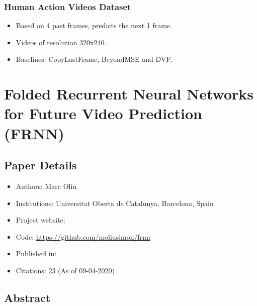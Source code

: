 \documentclass{article}
\begin{document}
    \subsubsection{Human Action Videos Dataset}\label{subsubsec:DYAN_A_Dynamical_Atoms_Based_Network_For_Video_Prediction:ucf-dataset}
    \begin{itemize}
        \item Based on 4 past frames, predicts the next 1 frame.
        \item Videos of resolution 320x240.
        \item Baselines: CopyLastFrame, BeyondMSE and DVF\@.
    \end{itemize}
    \newpage


    \section{Folded Recurrent Neural Networks for Future Video Prediction (FRNN)}\label{sec:Folded_Recurrent_Neural_Networks_for_Future_Video_Prediction_(FRNN)}
    \subsection*{Paper Details}
    \begin{itemize}
        \item Authors: Marc Oliu
        \item Institutions: Universitat Oberta de Catalunya, Barcelona, Spain
        \item Project website:
        \item Code: \url{https://github.com/moliusimon/frnn}
        \item Published in:
        \item Citations: 23 (As of 09-04-2020)
    \end{itemize}

    \subsection*{Abstract}
\end{document}
